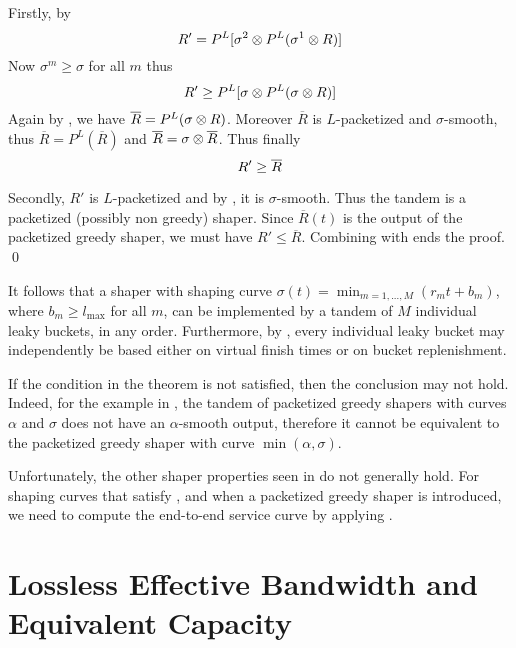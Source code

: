 Firstly, by 
$$R' = P^L [\sigma^2 \otimes P^L (\sigma^1 \otimes R)]$$
Now $\sigma^m \geq \sigma$ for all $m$ thus
$$R' \geq  P^L [\sigma \otimes P^L (\sigma \otimes R)]$$
Again by , we have $\overline{R} = P^L
(\sigma \otimes R)$. Moreover  $\overline{R}$ is $L$-packetized and
$\sigma$-smooth, thus $\overline{R}=P^L(\overline{R})$ and
$\overline{R}= \sigma \otimes \overline{R}$. Thus finally
\begin{equation}\mylabel{eq-prl-ks8}
 R' \geq  \overline{R}
\end{equation}

Secondly, $R'$ is $L$-packetized and by , it
is $\sigma$-smooth. Thus the tandem is a packetized (possibly non
greedy) shaper. Since $\overline{R}(t)$ is the output of the
packetized greedy shaper, we must have $R' \leq \overline{R}$.
Combining with  ends the proof. \qed

It follows that a shaper with shaping curve $\sigma(t)=
\min_{m=1,...,M} (r_m t+b_m)$, where $b_m \geq l_{\max}$ for all
$m$, can be implemented by a tandem of $M$ individual leaky
buckets, in any order. Furthermore, by , every
individual leaky bucket may independently be based either on
virtual finish times or on bucket replenishment.

If the condition in the theorem is not satisfied, then the
conclusion may not hold. Indeed, for the example in
, the tandem of packetized greedy shapers with
curves $\alpha$ and $\sigma$ does not have an $\alpha$-smooth
output, therefore it cannot be equivalent to the packetized greedy
shaper with curve $\min (\alpha, \sigma)$.



Unfortunately, the other shaper properties seen in 
do not generally hold. For shaping curves that satisfy
, and when a packetized greedy shaper is
introduced, we need to compute the end-to-end service curve by applying .%
%
%
%
%
%


\section[Effective Bandwidth and Equivalent Capacity]{Lossless Effective Bandwidth and Equivalent Capacity}
